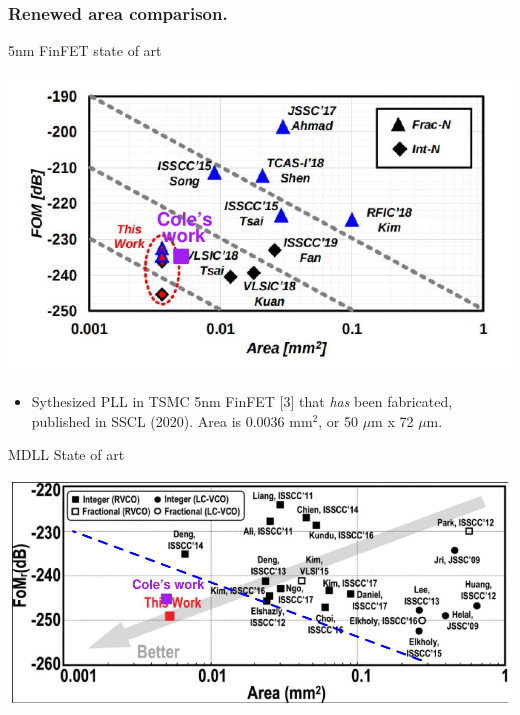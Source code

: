 \documentclass[t, screen, aspectratio=43]{beamer}
\begin{document}
\begin{frame}
	\frametitle{Renewed area comparison.}
	\begin{block}{5nm FinFET state of art}
	\begin{minipage}{5cm}
		\center\includegraphics[width=1\textwidth, angle=0]{fom_jitter_5nm.pdf}
	\end{minipage}
	\begin{minipage}{6cm}
		\tiny
		\begin{itemize}[itemsep=4pt,label=\protect---]
			\item Sythesized PLL in TSMC 5nm FinFET [3] that \textit{has} been fabricated, published in SSCL (2020). Area is 0.0036 mm$^2$, or 50 $\mu$m x 72 $\mu$m.
		\end{itemize} 	
	\end{minipage}
	\vspace{-1.2em}
	\end{block}
	\begin{block}{MDLL State of art}
	\begin{minipage}{5cm}
			\hspace{1em}\includegraphics[width=1\textwidth, angle=0]{fom_area_state_art2.pdf}
	\end{minipage}

\end{block}
\end{frame}
\end{document}

